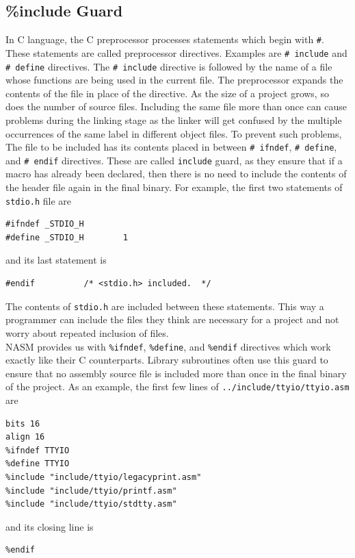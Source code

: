 \subsection{\%include Guard}
In C language, the C preprocessor processes statements which begin with \texttt{\#}. These statements are called preprocessor directives. Examples are \texttt{\# include} and \texttt{\# define} directives. The \texttt{\# include} directive is followed by the name of a file whose functions are being used in the current file. The preprocessor expands the contents of the file in place of the directive. As the size of a project grows, so does the number of source files. Including the same file more than once can cause problems during the linking stage as the linker will get confused by the multiple occurrences of the same label in different object files. To prevent such problems, The file to be included has its contents placed in between \texttt{\# ifndef}, \texttt{\# define}, and \texttt{\# endif} directives. These are called \texttt{include} guard, as they ensure that if a macro has already been declared, then there is no need to include the contents of the header file again in the final binary. For example, the first two statements of \texttt{stdio.h} file are
\begin{Verbatim}
#ifndef _STDIO_H
#define _STDIO_H		1
\end{Verbatim}
and its last statement is
\begin{Verbatim}
#endif			/* <stdio.h> included.  */
\end{Verbatim}
The contents of \texttt{stdio.h} are included between these statements. This way a programmer can include the files they think are necessary for a project and not worry about repeated inclusion of files.\\
NASM provides us with \texttt{\%ifndef}, \texttt{\%define}, and \texttt{\%endif} directives which work exactly like their C counterparts. Library subroutines often use this guard to ensure that no assembly source file is included more than once in the final binary of the project. As an example, the first few lines of \texttt{../include/ttyio/ttyio.asm} are
\begin{Verbatim}
bits 16
align 16
%ifndef TTYIO
%define TTYIO
%include "include/ttyio/legacyprint.asm"
%include "include/ttyio/printf.asm"
%include "include/ttyio/stdtty.asm"
\end{Verbatim}

and its closing line is
\begin{Verbatim}
%endif
\end{Verbatim}

